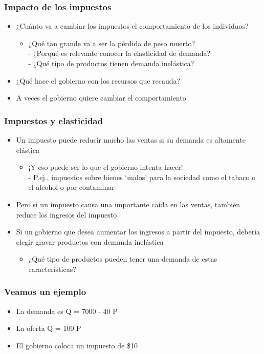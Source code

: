 \documentclass{beamer}
\begin{document}
\begin{frame}
\frametitle{Impacto de los impuestos}
\begin{itemize}
    \item ¿Cuánto va a cambiar los impuestos el comportamiento de los individuos?
    \begin{itemize}
        \item ¿Qué tan grande va a ser la pérdida de peso muerto? \\
        - ¿Porqué es relevante conocer la elasticidad de demanda? \\
        - ¿Qué tipo de productos tienen demanda inelástica?
    \end{itemize}
    \item ¿Qué hace el gobierno con los recursos que recauda?
    \item A veces el gobierno quiere cambiar el comportamiento
\end{itemize}
\end{frame}

\begin{frame}
\frametitle{Impuestos y elasticidad}
\begin{itemize}
    \item Un impuesto puede reducir mucho las ventas si su demanda es altamente elástica
    \begin{itemize}
        \item ¡Y eso puede ser lo que el gobierno intenta hacer! \\
        - P.ej., impuestos sobre bienes ‘malos’ para la sociedad como el tabaco o el alcohol o por contaminar
    \end{itemize}
    \item Pero si un impuesto causa una importante caída en las ventas, también reduce los ingresos del impuesto
    \item Si un gobierno que desea aumentar los ingresos a partir del impuesto, debería elegir gravar productos con demanda inelástica
    \begin{itemize}
        \item ¿Qué tipo de productos pueden tener una demanda de estas características?
    \end{itemize}
\end{itemize}
\end{frame}

\begin{frame}
\frametitle{Veamos un ejemplo}
\begin{itemize}
    \item La demanda es Q = 7000 - 40 P 
    \item La oferta Q = 100 P
    \item El gobierno coloca un impuesto de \$10
\end{itemize}
\end{frame}
\end{document}

